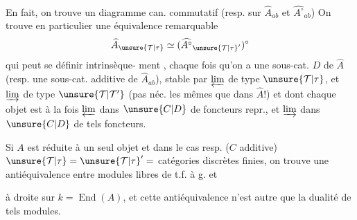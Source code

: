 En fait, on trouve un diagramme
can. commutatif
(resp. sur $\widehat A_{ab}$ et $\widehat{A^\circ}_{ab}$)
On trouve en particulier une
équivalence remarquable
\[
\widehat A_{\unsure{\mathcal{T}|\tau}}\simeq(\widehat{A^\circ}_{\unsure{\mathcal{T}|\tau}'})^\circ
\]
qui peut se définir intrinsèque-
ment , chaque fois qu'on a une
sous-cat. $D$ de $\widehat A$ (resp. une sous-cat.
additive de $\widehat A_{ab}$), stable  par
$\varprojlim$ de type $\unsure{\mathcal{T}|\tau}$, et  $\varinjlim$ de type $\unsure{\mathcal{T}|\mathcal{T}'}$
(pas néc. les mêmes que dans $\widehat A$!)
et dont chaque objet est à la fois
$\varprojlim$  dans $\unsure{C|D}$ de foncteurs repr.,
et $\varinjlim$  dans $\unsure{C|D}$ de tels foncteurs.

Si $A$ est réduite à un seul objet  et
dans le cas resp. ($C$ additive)
$\unsure{\mathcal{T}|\tau}=\unsure{\mathcal{T}|\tau}'=$  catégories discrètes finies,
on trouve une antiéquivalence
entre modules libres de t.f. à g. et

à droite sur $k=\operatorname{End}(A)$, et cette
antiéquivalence n'est autre que la
dualité de tels modules.

